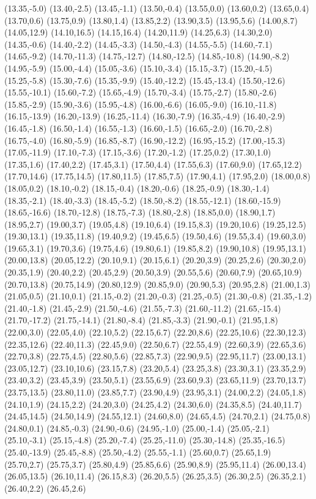 (13.35,-5.0) (13.40,-2.5) (13.45,-1.1) (13.50,-0.4) (13.55,0.0) (13.60,0.2) (13.65,0.4) (13.70,0.6) (13.75,0.9) (13.80,1.4) (13.85,2.2) (13.90,3.5) (13.95,5.6) (14.00,8.7) (14.05,12.9) (14.10,16.5) (14.15,16.4) (14.20,11.9) (14.25,6.3) (14.30,2.0) (14.35,-0.6) (14.40,-2.2) (14.45,-3.3) (14.50,-4.3) (14.55,-5.5) (14.60,-7.1) (14.65,-9.2) (14.70,-11.3) (14.75,-12.7) (14.80,-12.5) (14.85,-10.8) (14.90,-8.2) (14.95,-5.9) (15.00,-4.4) (15.05,-3.6) (15.10,-3.4) (15.15,-3.7) (15.20,-4.5) (15.25,-5.8) (15.30,-7.6) (15.35,-9.9) (15.40,-12.2) (15.45,-13.4) (15.50,-12.6) (15.55,-10.1) (15.60,-7.2) (15.65,-4.9) (15.70,-3.4) (15.75,-2.7) (15.80,-2.6) (15.85,-2.9) (15.90,-3.6) (15.95,-4.8) (16.00,-6.6) (16.05,-9.0) (16.10,-11.8) (16.15,-13.9) (16.20,-13.9) (16.25,-11.4) (16.30,-7.9) (16.35,-4.9) (16.40,-2.9) (16.45,-1.8) (16.50,-1.4) (16.55,-1.3) (16.60,-1.5) (16.65,-2.0) (16.70,-2.8) (16.75,-4.0) (16.80,-5.9) (16.85,-8.7) (16.90,-12.2) (16.95,-15.2) (17.00,-15.3) (17.05,-11.9) (17.10,-7.3) (17.15,-3.6) (17.20,-1.2) (17.25,0.2) (17.30,1.0) (17.35,1.6) (17.40,2.2) (17.45,3.1) (17.50,4.4) (17.55,6.3) (17.60,9.0) (17.65,12.2) (17.70,14.6) (17.75,14.5) (17.80,11.5) (17.85,7.5) (17.90,4.1) (17.95,2.0) (18.00,0.8) (18.05,0.2) (18.10,-0.2) (18.15,-0.4) (18.20,-0.6) (18.25,-0.9) (18.30,-1.4) (18.35,-2.1) (18.40,-3.3) (18.45,-5.2) (18.50,-8.2) (18.55,-12.1) (18.60,-15.9) (18.65,-16.6) (18.70,-12.8) (18.75,-7.3) (18.80,-2.8) (18.85,0.0) (18.90,1.7) (18.95,2.7) (19.00,3.7) (19.05,4.8) (19.10,6.4) (19.15,8.3) (19.20,10.6) (19.25,12.5) (19.30,13.1) (19.35,11.8) (19.40,9.2) (19.45,6.5) (19.50,4.6) (19.55,3.4) (19.60,3.0) (19.65,3.1) (19.70,3.6) (19.75,4.6) (19.80,6.1) (19.85,8.2) (19.90,10.8) (19.95,13.1) (20.00,13.8) (20.05,12.2) (20.10,9.1) (20.15,6.1) (20.20,3.9) (20.25,2.6) (20.30,2.0) (20.35,1.9) (20.40,2.2) (20.45,2.9) (20.50,3.9) (20.55,5.6) (20.60,7.9) (20.65,10.9) (20.70,13.8) (20.75,14.9) (20.80,12.9) (20.85,9.0) (20.90,5.3) (20.95,2.8) (21.00,1.3) (21.05,0.5) (21.10,0.1) (21.15,-0.2) (21.20,-0.3) (21.25,-0.5) (21.30,-0.8) (21.35,-1.2) (21.40,-1.8) (21.45,-2.9) (21.50,-4.6) (21.55,-7.3) (21.60,-11.2) (21.65,-15.4) (21.70,-17.2) (21.75,-14.1) (21.80,-8.4) (21.85,-3.3) (21.90,-0.1) (21.95,1.8) (22.00,3.0) (22.05,4.0) (22.10,5.2) (22.15,6.7) (22.20,8.6) (22.25,10.6) (22.30,12.3) (22.35,12.6) (22.40,11.3) (22.45,9.0) (22.50,6.7) (22.55,4.9) (22.60,3.9) (22.65,3.6) (22.70,3.8) (22.75,4.5) (22.80,5.6) (22.85,7.3) (22.90,9.5) (22.95,11.7) (23.00,13.1) (23.05,12.7) (23.10,10.6) (23.15,7.8) (23.20,5.4) (23.25,3.8) (23.30,3.1) (23.35,2.9) (23.40,3.2) (23.45,3.9) (23.50,5.1) (23.55,6.9) (23.60,9.3) (23.65,11.9) (23.70,13.7) (23.75,13.5) (23.80,11.0) (23.85,7.7) (23.90,4.9) (23.95,3.1) (24.00,2.2) (24.05,1.8) (24.10,1.9) (24.15,2.2) (24.20,3.0) (24.25,4.2) (24.30,6.0) (24.35,8.5) (24.40,11.7) (24.45,14.5) (24.50,14.9) (24.55,12.1) (24.60,8.0) (24.65,4.5) (24.70,2.1) (24.75,0.8) (24.80,0.1) (24.85,-0.3) (24.90,-0.6) (24.95,-1.0) (25.00,-1.4) (25.05,-2.1) (25.10,-3.1) (25.15,-4.8) (25.20,-7.4) (25.25,-11.0) (25.30,-14.8) (25.35,-16.5) (25.40,-13.9) (25.45,-8.8) (25.50,-4.2) (25.55,-1.1) (25.60,0.7) (25.65,1.9) (25.70,2.7) (25.75,3.7) (25.80,4.9) (25.85,6.6) (25.90,8.9) (25.95,11.4) (26.00,13.4) (26.05,13.5) (26.10,11.4) (26.15,8.3) (26.20,5.5) (26.25,3.5) (26.30,2.5) (26.35,2.1) (26.40,2.2) (26.45,2.6) 
